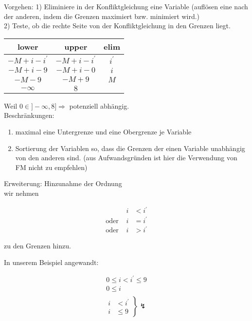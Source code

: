 Vorgehen:
1) Eliminiere in der Konfliktgleichung eine Variable (auflösen eine nach der anderen, indem die Grenzen maximiert bzw. minimiert wird.)\\
2) Teste, ob die rechte Seite von der Konfliktgleichung in den Grenzen liegt.\\

\begin{tabular}{c|c|c}
lower & upper & elim \\
\hline
\( -M + i - i^\prime \) & \( -M+i-i^\prime\) & \(i^\prime \) \\
\hline
\( -M+ i - 9 \) & \( -M + i -0 \) & \( i \) \\
\hline
\(-M -9 \) & \( -M +9 \) & \( M \) \\
\hline
\( -\infty \) & \(8\) & \\
\end{tabular}

Weil \( 0 \in ] - \infty, 8 ] \Rightarrow \) potenziell abhängig. \\

Beschränkungen: \\
\begin{enumerate}
	\item maximal eine Untergrenze und eine Obergrenze je Variable
	\item Sortierung der Variablen so, dass die Grenzen der einen Variable unabhängig von den anderen sind. (aus Aufwandsgründen ist hier die Verwendung von FM nicht zu empfehlen)
\end{enumerate}

Erweiterung: Hinzunahme der Ordnung \\
wir nehmen

\begin{align*}
\text{ } & i &< i^\prime \\
\text{oder } & i &= i^\prime \\
\text{oder } & i &> i^\prime
\end{align*}

zu den Grenzen hinzu.

In unserem Beispiel angewandt:

\begin{align*}
0 \leq i < i^\prime  \leq 9 \\
0 \leq i \\
\end{align*}
\[
\left.
\begin{array}{cc}
i & < i^\prime \\
i & \leq  9
\end{array}
\right \} \lightning
\]

